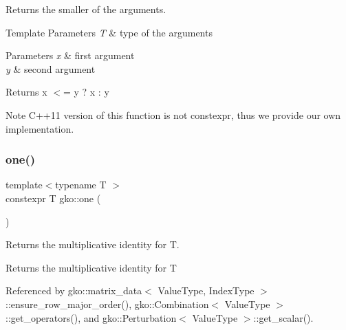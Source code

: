 Returns the smaller of the arguments. 


\begin{DoxyTemplParams}{Template Parameters}
{\em T} & type of the arguments\\
\hline
\end{DoxyTemplParams}

\begin{DoxyParams}{Parameters}
{\em x} & first argument \\
\hline
{\em y} & second argument\\
\hline
\end{DoxyParams}
\begin{DoxyReturn}{Returns}
x $<$= y ? x \+: y
\end{DoxyReturn}
\begin{DoxyNote}{Note}
C++11 version of this function is not {\ttfamily constexpr}, thus we provide our own implementation. 
\end{DoxyNote}
\mbox{\label{namespacegko_a0059e27f8f4bc348ff65c1e60caf47c8}} 
\subsubsection{\texorpdfstring{one()}{one()}\hspace{0.1cm}{\footnotesize\ttfamily [1/2]}}
{\footnotesize\ttfamily template$<$typename T $>$ \\
constexpr T gko\+::one (\begin{DoxyParamCaption}{ }\end{DoxyParamCaption})\hspace{0.3cm}{\ttfamily [inline]}}



Returns the multiplicative identity for T. 

\begin{DoxyReturn}{Returns}
the multiplicative identity for T 
\end{DoxyReturn}


Referenced by gko\+::matrix\+\_\+data$<$ Value\+Type, Index\+Type $>$\+::ensure\+\_\+row\+\_\+major\+\_\+order(), gko\+::\+Combination$<$ Value\+Type $>$\+::get\+\_\+operators(), and gko\+::\+Perturbation$<$ Value\+Type $>$\+::get\+\_\+scalar().

\mbox{\label{namespacegko_ab4f16ecf0a759f46259cf9518f1e4568}} 
